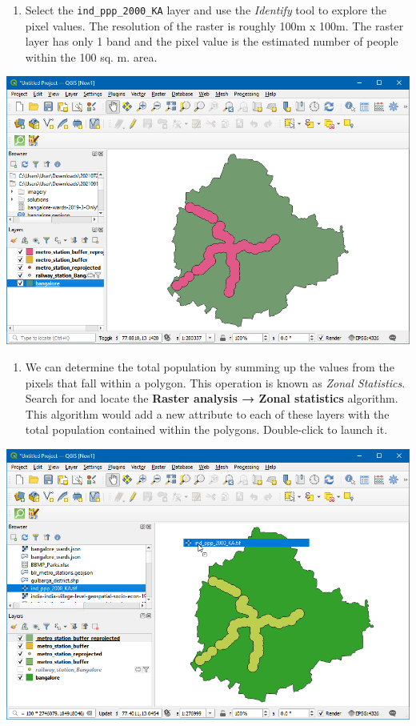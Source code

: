\documentclass[
  12pt,
  a4paper]{article}
\providecommand{\tightlist}{%
  \setlength{\itemsep}{0pt}\setlength{\parskip}{0pt}}
\begin{document}
\begin{enumerate}
\def\labelenumi{\arabic{enumi}.}
\setcounter{enumi}{12}
\tightlist
\item
  Select the \texttt{ind\_ppp\_2000\_KA} layer and use the
  \emph{Identify} tool to explore the pixel values. The resolution of
  the raster is roughly 100m x 100m. The raster layer has only 1 band
  and the pixel value is the estimated number of people within the 100
  sq. m. area.
\end{enumerate}

\begin{center}\includegraphics[width=0.75\linewidth]{images/spatial_data_viz/pop13} \end{center}

\begin{enumerate}
\def\labelenumi{\arabic{enumi}.}
\setcounter{enumi}{13}
\tightlist
\item
  We can determine the total population by summing up the values from
  the pixels that fall within a polygon. This operation is known as
  \emph{Zonal Statistics}. Search for and locate the \textbf{Raster
  analysis → Zonal statistics} algorithm. This algorithm would add a new
  attribute to each of these layers with the total population contained
  within the polygons. Double-click to launch it.
\end{enumerate}

\begin{center}\includegraphics[width=0.75\linewidth]{images/spatial_data_viz/pop14} \end{center}
\end{document}

